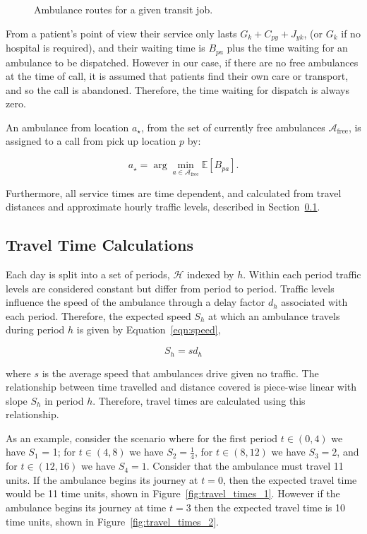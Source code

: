\documentclass[preprint,12pt]{elsarticle}
\begin{document}
\begin{figure} \centering 
\caption{Ambulance routes for a given transit job.} \label{fig:travel_routes}
\end{figure}

From a patient's point of view their service only lasts $G_k + C_{py} + J_{yk}$,
(or $G_k$ if no hospital is required), and their waiting time is $B_{pa}$ plus
the time waiting for an ambulance to be dispatched. However in our case, if
there are no free ambulances at the time of call, it is assumed that patients
find their own care or transport, and so the call is abandoned. Therefore, the
time waiting for dispatch is always zero.

An ambulance from location $a_{\star}$, from the set of currently free
ambulances $\mathcal{A}_{\text{free}}$, is assigned to a call from pick up
location $p$ by:

\begin{equation}\label{eqn:choose_vehicle} a_{\star} = \arg\min_{a \in
\mathcal{A}_{\text{free}}} \mathbb{E}\left[B_{pa}\right].  \end{equation}

Furthermore, all service times are time dependent, and calculated from travel
distances and approximate hourly traffic levels, described in
Section~\ref{sec:travel_times}.

\subsection{Travel Time Calculations}\label{sec:travel_times} Each day is split
into a set of periods, $\mathcal{H}$ indexed by $h$.  Within each period traffic
levels are considered constant but differ from period to period. Traffic levels
influence the speed of the ambulance through a delay factor $d_h$ associated
with each period.  Therefore, the expected speed $S_h$ at which an ambulance
travels during period $h$ is given by Equation~\ref{eqn:speed},

\begin{equation}\label{eqn:speed} S_h = s d_h \end{equation}

where $s$ is the average speed that ambulances drive given no traffic.  The
relationship between time travelled and distance covered is piece-wise linear
with slope $S_h$ in period $h$. Therefore, travel times are calculated using
this relationship.

As an example, consider the scenario where for the first period $t \in (0, 4)$
we have $S_1$ = 1; for $t \in (4, 8)$ we have $S_2 = \frac{1}{4}$, for $t \in
(8, 12)$ we have $S_3 = 2$, and for $t \in (12, 16)$ we have $S_4 = 1$.
Consider that the ambulance must travel 11 units.  If the ambulance begins its
journey at $t=0$, then the expected travel time would be 11 time units, shown in
Figure~\ref{fig:travel_times_1}.  However if the ambulance begins its journey at
time $t=3$ then the expected travel time is 10 time units, shown in
Figure~\ref{fig:travel_times_2}.
\end{document}
